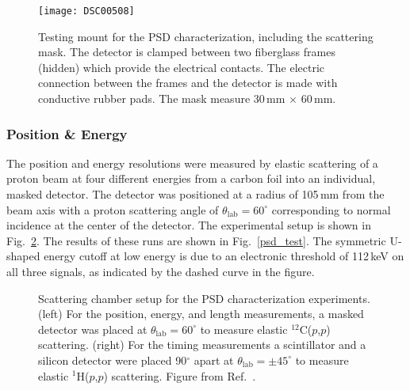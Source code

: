 \begin{figure}
\centering
\texttt{[image: DSC00508]}%
\caption[Testing mount for the PSD characterization, including the scattering mask]{Testing mount for the PSD characterization, including the scattering mask.  The detector is clamped between two fiberglass frames (hidden) which provide the electrical contacts.  The electric connection between the frames and the detector is made with conductive rubber pads.  The mask measure 30\,mm $\times$ 60\,mm.}%
\label{test_mount}%
\end{figure}

\subsubsection{Position \& Energy}
The position and energy resolutions were measured by elastic scattering of a proton beam at four different energies from a carbon foil into an individual, masked detector.  The detector was positioned at a radius of 105\,mm from the beam axis with a proton scattering angle of $\theta_\mathrm{lab}=60^\circ$ corresponding to normal incidence at the center of the detector.  The experimental setup is shown in Fig.~\ref{scat_setup}.  The results of these runs are shown in Fig.~\ref{psd_test}.  The symmetric U-shaped energy cutoff at low energy is due to an electronic threshold of 112\,keV on all three signals, as indicated by the dashed curve in the figure.

\begin{figure}%
\centering
{}%
\caption[Scattering chamber setup for the PSD characterization experiments]{Scattering chamber setup for the PSD characterization experiments.  (left) For the position, energy, and length measurements, a masked detector was placed at $\theta_\mathrm{lab}=60^\circ$ to measure elastic $^{12}$C($p$,$p$) scattering. (right) For the timing measurements a scintillator and a silicon detector were placed 90$^\circ$ apart at $\theta_\mathrm{lab}=\pm45^\circ$ to measure elastic $^1$H($p$,$p$) scattering.  Figure from Ref.~\cite{Marley_2008}.}
\label{scat_setup}%
\end{figure}

